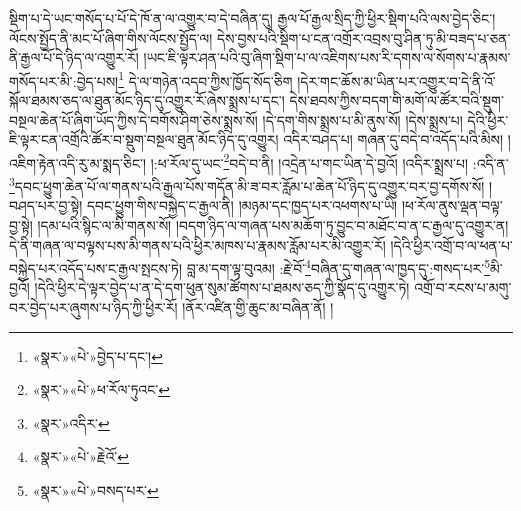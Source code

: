 སྡིག་པ་དེ་ཡང་གསོད་པ་པོ་དེ་ཁོ་ན་ལ་འགྱུར་བ་དེ་བཞིན་དུ། རྒྱལ་པོ་རྒྱལ་སྲིད་ཀྱི་ཕྱིར་སྡིག་པའི་ལས་བྱེད་ཅིང་། ལོངས་སྤྱོད་ནི་མང་པོ་ཞིག་གིས་ལོངས་སྤྱོད་ལ། དེས་བྱས་པའི་སྡིག་པ་ངན་འགྲོར་འབྲས་བུ་ཤིན་ཏུ་མི་བཟད་པ་ཅན་ནི་རྒྱལ་པོ་དེ་ཉིད་ལ་འགྱུར་རོ། །ཡང་ཇི་ལྟར་ཤན་པའི་བུ་ཞིག་སྡིག་པ་ལ་འཇིགས་པས་རི་དགས་ལ་སོགས་པ་རྣམས་གསོད་པར་མི་:བྱེད་པས།\footnote{«སྣར་»«པེ་»བྱེད་པ་དང་།} དེ་ལ་གཉེན་འདབ་ཀྱིས་ཁྱོད་སོད་ཅིག །དེར་གང་ཆོས་མ་ཡིན་པར་འགྱུར་བ་དེ་ནི་འོ་སྐོལ་ཐམས་ཅད་ལ་ཐུན་མོང་ཉིད་དུ་འགྱུར་རོ་ཞེས་སྨྲས་པ་དང་། དེས་ཐབས་ཀྱིས་བདག་གི་མགོ་ལ་ཚོར་བའི་སྡུག་བསྔལ་ཆེན་པོ་ཞིག་ཡོད་ཀྱིས་དེ་བགོས་ཤིག་ཅེས་སྨྲས་སོ། །དེ་དག་གིས་སྨྲས་པ་མི་ནུས་སོ། །དེས་སྨྲས་པ། དེའི་ཕྱིར་ཇི་ལྟར་ངན་འགྲོའི་ཚོར་བ་སྡུག་བསྔལ་ཐུན་མོང་ཉིད་དུ་འགྱུར། འདིར་བཤད་པ། གཞན་དུ་བདེ་བ་འདོད་པའི་མིས། །འཇིག་རྟེན་འདི་རུ་མ་སྨད་ཅིང་། །:ཕ་རོལ་དུ་ཡང་\footnote{«སྣར་»«པེ་»ཕ་རོལ་ཏུའང་}བདེ་བ་ནི། །འདྲེན་པ་གང་ཡིན་དེ་བྱའོ། །འདིར་སྨྲས་པ། :འདི་ན་\footnote{«སྣར་»འདིར་}དབང་ཕྱུག་ཆེན་པོ་ལ་གནས་པའི་རྒྱལ་པོས་གདོན་མི་ཟ་བར་རློམ་པ་ཆེན་པོ་ཉིད་དུ་འགྱུར་བར་བྱ་དགོས་སོ། །བཤད་པར་བྱ་སྟེ། དབང་ཕྱུག་གིས་བསྐྱེད་ང་རྒྱལ་ནི། །མཉམ་དང་ཁྱད་པར་འཕགས་པ་ཡི། །ཕ་རོལ་ནུས་ལྡན་བལྟ་བྱ་སྟེ། །དམ་པའི་སྙིང་ལ་མི་གནས་སོ། །བདག་ཉིད་ལ་གཞན་པས་མཆོག་ཏུ་བྱུང་བ་མཐོང་བ་ན་ང་རྒྱལ་དུ་འགྱུར་ན། དེ་ནི་གཞན་ལ་བལྟས་པས་མི་གནས་པའི་ཕྱིར་མཁས་པ་རྣམས་རློམ་པར་མི་འགྱུར་རོ། །དེའི་ཕྱིར་འགྲོ་བ་ལ་ཕན་པ་བསྐྱེད་པར་འདོད་པས་ང་རྒྱལ་སྤངས་ཏེ། བླ་མ་དག་ལྟ་བུའམ། :རྗེ་བོ་\footnote{«སྣར་»«པེ་»རྗེའོ་}བཞིན་དུ་གཞན་ལ་ཁྱད་དུ་:གསད་པར་\footnote{«སྣར་»«པེ་»བསད་པར་}མི་བྱའོ། །དེའི་ཕྱིར་དེ་ལྟར་བྱེད་པ་ན་དེ་དག་ཕུན་སུམ་ཚོགས་པ་ཐམས་ཅད་ཀྱི་སྣོད་དུ་འགྱུར་ཏེ། འགྲོ་བ་རངས་པ་མགུ་བར་བྱེད་པར་ཞུགས་པ་ཉིད་ཀྱི་ཕྱིར་རོ། །ནོར་འཛིན་གྱི་ཆུང་མ་བཞིན་ནོ། །
